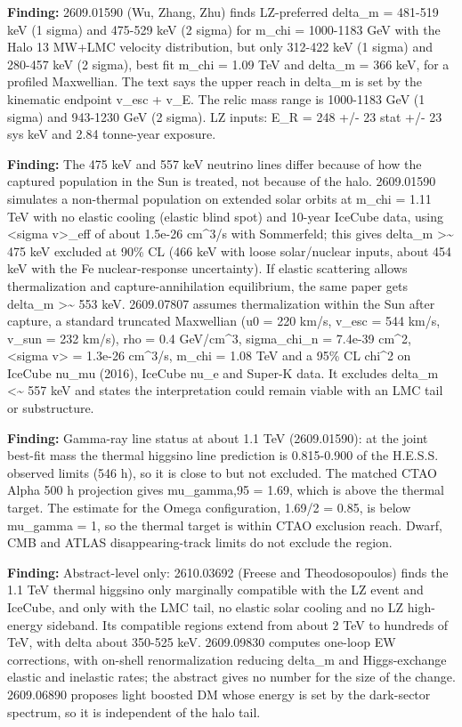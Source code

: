 \documentclass[11pt,a4paper]{article}
\begin{document}
\textbf{Finding:} 2609.01590 (Wu, Zhang, Zhu) finds LZ-preferred delta\_m = 481-519 keV (1 sigma) and 475-529 keV (2 sigma) for m\_chi = 1000-1183 GeV with the Halo 13 MW+LMC velocity distribution, but only 312-422 keV (1 sigma) and 280-457 keV (2 sigma), best fit m\_chi = 1.09 TeV and delta\_m = 366 keV, for a profiled Maxwellian. The text says the upper reach in delta\_m is set by the kinematic endpoint v\_esc + v\_E. The relic mass range is 1000-1183 GeV (1 sigma) and 943-1230 GeV (2 sigma). LZ inputs: E\_R = 248 +/- 23 stat +/- 23 sys keV and 2.84 tonne-year exposure.

\textbf{Finding:} The 475 keV and 557 keV neutrino lines differ because of how the captured population in the Sun is treated, not because of the halo. 2609.01590 simulates a non-thermal population on extended solar orbits at m\_chi = 1.11 TeV with no elastic cooling (elastic blind spot) and 10-year IceCube data, using \textless{}sigma v\textgreater{}\_eff of about 1.5e-26 cm\textasciicircum{}3/s with Sommerfeld; this gives delta\_m \textgreater{}\textasciitilde{} 475 keV excluded at 90\% CL (466 keV with loose solar/nuclear inputs, about 454 keV with the Fe nuclear-response uncertainty). If elastic scattering allows thermalization and capture-annihilation equilibrium, the same paper gets delta\_m \textgreater{}\textasciitilde{} 553 keV. 2609.07807 assumes thermalization within the Sun after capture, a standard truncated Maxwellian (u0 = 220 km/s, v\_esc = 544 km/s, v\_sun = 232 km/s), rho = 0.4 GeV/cm\textasciicircum{}3, sigma\_chi\_n = 7.4e-39 cm\textasciicircum{}2, \textless{}sigma v\textgreater{} = 1.3e-26 cm\textasciicircum{}3/s, m\_chi = 1.08 TeV and a 95\% CL chi\textasciicircum{}2 on IceCube nu\_mu (2016), IceCube nu\_e and Super-K data. It excludes delta\_m \textless{}\textasciitilde{} 557 keV and states the interpretation could remain viable with an LMC tail or substructure.

\textbf{Finding:} Gamma-ray line status at about 1.1 TeV (2609.01590): at the joint best-fit mass the thermal higgsino line prediction is 0.815-0.900 of the H.E.S.S. observed limits (546 h), so it is close to but not excluded. The matched CTAO Alpha 500 h projection gives mu\_gamma,95 = 1.69, which is above the thermal target. The estimate for the Omega configuration, 1.69/2 = 0.85, is below mu\_gamma = 1, so the thermal target is within CTAO exclusion reach. Dwarf, CMB and ATLAS disappearing-track limits do not exclude the region.

\textbf{Finding:} Abstract-level only: 2610.03692 (Freese and Theodosopoulos) finds the 1.1 TeV thermal higgsino only marginally compatible with the LZ event and IceCube, and only with the LMC tail, no elastic solar cooling and no LZ high-energy sideband. Its compatible regions extend from about 2 TeV to hundreds of TeV, with delta about 350-525 keV. 2609.09830 computes one-loop EW corrections, with on-shell renormalization reducing delta\_m and Higgs-exchange elastic and inelastic rates; the abstract gives no number for the size of the change. 2609.06890 proposes light boosted DM whose energy is set by the dark-sector spectrum, so it is independent of the halo tail.
\end{document}
